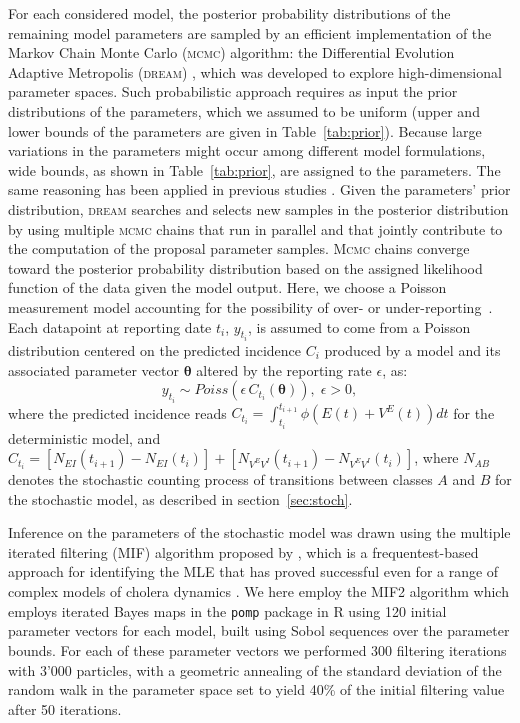 For each considered model, the posterior probability distributions of the remaining model parameters are sampled by an efficient implementation of the Markov Chain Monte Carlo \textsc{(mcmc)} algorithm: the Differential Evolution Adaptive Metropolis (\textsc{dream}) \cite{vrugt09}, which was developed to explore high-dimensional parameter spaces. Such probabilistic approach requires as input the prior distributions of the parameters, which we assumed to be uniform (upper and lower bounds of the parameters  are given in Table~\ref{tab:prior}). Because large variations in the parameters might occur among different model formulations, wide bounds, as shown in Table~\ref{tab:prior}, are assigned to the parameters. The same reasoning has been applied in previous studies \cite{bertuzzo16,akman_2016}. Given the parameters' prior distribution, \textsc{dream} searches and selects new samples in the posterior distribution by using multiple \textsc{mcmc} chains that run in parallel and that jointly contribute to the computation of the proposal parameter samples. \textsc{Mcmc} chains  converge toward the posterior probability distribution based on the assigned likelihood function of the data given the model output. Here, we choose a Poisson measurement model accounting for the possibility of over- or under-reporting~\cite{camacho18}. Each datapoint at reporting date $t_i$,  $y_{t_i}$, is assumed to come from a Poisson distribution centered on the predicted incidence $C_i$ produced by a model and its associated parameter vector $\boldsymbol{\theta}$ altered by the reporting rate $\epsilon$, as:
%
\begin{equation}
 y_{t_i}  \sim Poiss\left(\epsilon \,C_{t_i}(\boldsymbol{\theta})\right), \; \epsilon > 0,
 \label{eq:obs}
\end{equation}
%
where the predicted incidence reads $ C_{t_i} = \int_{t_i}^{t_{i+1}} \phi \left(E(t) + V^E(t)\right) dt  $ for the deterministic model, and $ C_{t_i} = [N_{EI}(t_{i+1}) - N_{EI}(t_i)] + [N_{V^EV^I}(t_{i+1}) - N_{V^EV^I}(t_i)] $, where $N_{AB}$ denotes the stochastic counting process of transitions between classes $A$ and $B$ for the stochastic model, as described in section~\ref{sec:stoch}.

Inference on the parameters of the stochastic model was drawn using the multiple iterated filtering (MIF) algorithm proposed by \cite{Ionides2015}, which is a frequentest-based approach for identifying the MLE that has proved successful even for a range of complex models of cholera dynamics \cite{king08,baracchini16}. We here employ the MIF2 algorithm which employs iterated Bayes maps in the \texttt{pomp} package in R \cite{King2016, King2018} using 120 initial parameter vectors for each model, built using Sobol sequences over the parameter bounds. For each of these parameter vectors we performed 300 filtering iterations with 3'000 particles, with a geometric annealing of the standard deviation of the random walk in the parameter space set to yield 40\% of the initial filtering value after 50 iterations.

